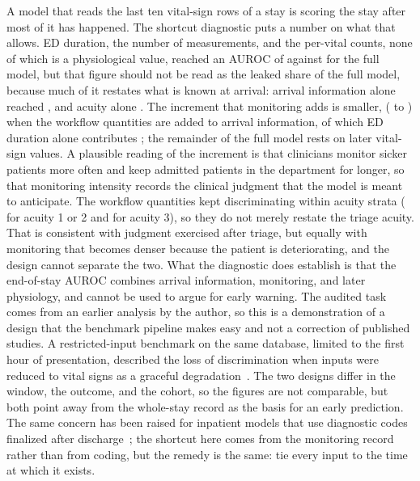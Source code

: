 A model that reads the last ten vital-sign rows of a stay is scoring the stay after most of it has happened. The shortcut diagnostic puts a number on what that allows. ED
duration, the number of measurements, and the per-vital counts, none of which is a physiological value, reached an AUROC of \RVShortAAuroc{} against
\RVEosHybridAuroc{} for the full model, but that figure should not be read as the leaked share of the full model, because much of it restates what is known at arrival: arrival information alone reached \RVIncArr{}, and acuity alone \RVAcuOverallAcu{}. The increment that monitoring adds is smaller, \RVIncWorkOverArr{} (\RVIncWorkOverArrLo{} to \RVIncWorkOverArrHi{}) when the workflow quantities are added to arrival information, of which ED duration alone contributes \RVIncDurOverArr{}; the remainder of the full model rests on later vital-sign values. A plausible reading of the increment is that clinicians monitor sicker patients more often and keep admitted patients in the department for
longer, so that monitoring intensity records the clinical judgment that the model is meant to anticipate. The workflow quantities kept discriminating within acuity
strata (\RVAcuHighWork{} for acuity 1 or 2 and \RVAcuMidWork{} for acuity 3), so they do not merely restate the triage acuity. That is consistent with judgment exercised
after triage, but equally with monitoring that becomes denser because the patient is deteriorating, and the design cannot separate the two. What the diagnostic does
establish is that the end-of-stay AUROC combines arrival information, monitoring, and later physiology, and cannot be used to argue for early warning. The audited task comes from an earlier analysis by the author, so this is a demonstration of a design that the benchmark pipeline makes easy and not a correction of published studies. A restricted-input benchmark on the same database, limited to the first hour
of presentation, described the loss of discrimination when inputs were reduced to vital signs as a graceful degradation~\cite{solaiman2026earlydeterioration}. The two designs differ in
the window, the outcome, and the cohort, so the figures are not comparable, but both point away from the whole-stay record as the basis for an early prediction. The
same concern has been raised for inpatient models that use diagnostic codes finalized after discharge~\cite{ramadan2025icdleakage}; the shortcut here comes from the
monitoring record rather than from coding, but the remedy is the same: tie every input to the time at which it exists.

